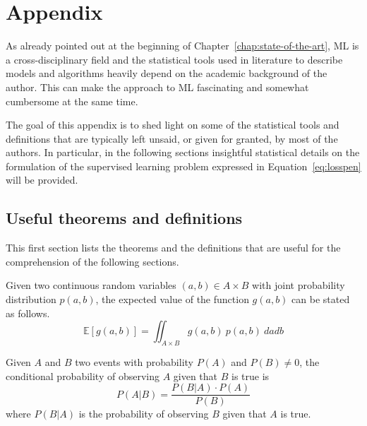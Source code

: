 \appendix

\chapter{Appendix} \label{appendix:A}
As already pointed out at the beginning of Chapter~\ref{chap:state-of-the-art}, ML is a cross-disciplinary field and the statistical tools used in literature to describe models and algorithms heavily depend on the academic background of the author. This can make the approach to ML fascinating and somewhat cumbersome at the same time.

The goal of this appendix is to shed light on some of the statistical tools and definitions that are typically left unsaid, or given for granted, by most of the authors. In particular, in the following sections insightful statistical details on the formulation of the supervised learning problem expressed in Equation~\eqref{eq:losspen} will be provided.


\section{Useful theorems and definitions}

This first section lists the theorems and the definitions that are useful for the comprehension of the following sections.

\begin{theorem} \label{th:lotus}
	Given two continuous random variables $(a,b) \in A \times B$ with joint probability distribution $p(a,b)$, the expected value of the function $g(a,b)$ can be stated as follows.
	$$\mathbb{E}[g(a,b)]=\iint_{A \times B}g(a,b)~p(a,b)~dadb$$
\end{theorem}

\begin{theorem} \label{th:bayes_rule}
	Given $A$ and $B$ two events with probability $P(A)$ and $P(B) \neq 0$, the conditional probability of observing $A$ given that $B$ is true is
	$$P(A|B) = \frac{P(B|A) \cdot P(A)}{P(B)}$$
	where $P(B|A)$ is the probability of observing $B$ given that $A$ is true.
\end{theorem}

